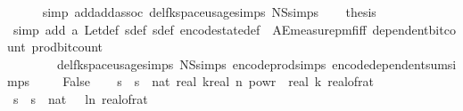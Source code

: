 \begin{isabellebody}
\ \ \ \ \isamarkupfalse%
\ {\isacharparenleft}{\kern0pt}simp\ add{\isacharcolon}{\kern0pt}add{\isachardot}{\kern0pt}assoc\ del{\isacharcolon}{\kern0pt}fk{\isacharunderscore}{\kern0pt}space{\isacharunderscore}{\kern0pt}usage{\isachardot}{\kern0pt}simps\ N\isactrlsub S{\isachardot}{\kern0pt}simps{\isacharparenright}{\kern0pt}\isanewline
\ \ \isamarkupfalse%
\ {\isacharquery}{\kern0pt}thesis\ \isanewline
\ \ \ \ \isamarkupfalse%
\ {\isacharparenleft}{\kern0pt}simp\ add{\isacharcolon}{\kern0pt}\ a\ Let{\isacharunderscore}{\kern0pt}def\ sdef\ sdef\ encode{\isacharunderscore}{\kern0pt}state{\isacharunderscore}{\kern0pt}def\ \ AE{\isacharunderscore}{\kern0pt}measure{\isacharunderscore}{\kern0pt}pmf{\isacharunderscore}{\kern0pt}iff\ dependent{\isacharunderscore}{\kern0pt}bit{\isacharunderscore}{\kern0pt}count\ prod{\isacharunderscore}{\kern0pt}bit{\isacharunderscore}{\kern0pt}count\isanewline
\ \ \ \ \ \ \ \ del{\isacharcolon}{\kern0pt}fk{\isacharunderscore}{\kern0pt}space{\isacharunderscore}{\kern0pt}usage{\isachardot}{\kern0pt}simps\ N\isactrlsub S{\isachardot}{\kern0pt}simps\ encode{\isacharunderscore}{\kern0pt}prod{\isachardot}{\kern0pt}simps\ encode{\isacharunderscore}{\kern0pt}dependent{\isacharunderscore}{\kern0pt}sum{\isachardot}{\kern0pt}simps{\isacharparenright}{\kern0pt}\ \isanewline
{}\isamarkupfalse%
\isanewline
\ \ \isamarkupfalse%
\ False\isanewline
\ \ \isamarkupfalse%
\ s\ \ {\isachardoublequoteopen}s\ {\isacharequal}{\kern0pt}\ nat\ {\isasymlceil}{}{\isacharasterisk}{\kern0pt}real\ k{\isacharasterisk}{\kern0pt}{\isacharparenleft}{\kern0pt}real\ n{\isacharparenright}{\kern0pt}\ powr\ {\isacharparenleft}{\kern0pt}{}{\isacharminus}{\kern0pt}{}{\isacharslash}{\kern0pt}\ real\ k{\isacharparenright}{\kern0pt}{\isacharslash}{\kern0pt}\ {\isacharparenleft}{\kern0pt}real{\isacharunderscore}{\kern0pt}of{\isacharunderscore}{\kern0pt}rat\ {\isasymdelta}{\isacharparenright}{\kern0pt}\isanewline
\ \ \isamarkupfalse%
\ s\ \ {\isachardoublequoteopen}s\ {\isacharequal}{\kern0pt}\ nat\ {\isasymlceil}{\isacharminus}{\kern0pt}{\isacharparenleft}{\kern0pt}{}{}\ {\isacharasterisk}{\kern0pt}\ ln\ {\isacharparenleft}{\kern0pt}real{\isacharunderscore}{\kern0pt}of{\isacharunderscore}{\kern0pt}rat\ {\isasymepsilon}{\isacharparenright}{\kern0pt}{\isacharparenright}{\kern0pt}{\isasymrceil}{\isachardoublequoteclose}\isanewline

\end{isabellebody}
